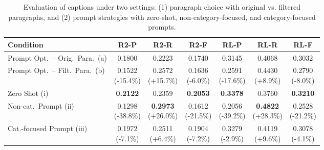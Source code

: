 \documentclass{article} %
\begin{document}
\begin{table}[t]
\begin{subtable}{\linewidth}
\centering
{}
\begin{adjustbox}{max width=0.9\textwidth}
\begin{tabular}{lcccccc}
\toprule
\textbf{Condition} & R2-P & R2-R & R2-F & RL-P & RL-R & RL-F \\
\midrule
Prompt Opt.\ -- Orig.\ Para.\ (a) & 0.1800 & 0.2223 & 0.1740 & 0.3145 & 0.4068 & 0.3032 \\
Prompt Opt.\ -- Filt.\ Para.\ (b) & \makecell{0.1522 \\ (-15.4\%)} & \makecell{0.2572 \\ (+15.7\%)} 
& \makecell{0.1636 \\ (-6.0\%)} & \makecell{0.2591 \\ (-17.6\%)} 
& \makecell{0.4430 \\ (+8.9\%)}  & \makecell{0.2790 \\ (-8.0\%)} \\
\midrule
Zero Shot (i)       & \textbf{0.2122} & 0.2359 & \textbf{0.2053} & \textbf{0.3378} & 0.3760 & \textbf{0.3210} \\
Non-cat.\ Prompt (ii) & \makecell{0.1298 \\ (-38.8\%)} & \makecell{\textbf{0.2973} \\ (+26.0\%)} 
& \makecell{0.1612 \\ (-21.5\%)} & \makecell{0.2056 \\ (-39.2\%)} 
& \makecell{\textbf{0.4822} \\ (+28.3\%)} & \makecell{0.2528 \\ (-21.2\%)} \\
Cat.-focused Prompt (iii) & \makecell{0.1972 \\ (-7.1\%)} & \makecell{0.2511 \\ (+6.4\%)} 
& \makecell{0.1904 \\ (-7.2\%)} & \makecell{0.3279 \\ (-2.9\%)} 
& \makecell{0.4119 \\ (+9.6\%)} & \makecell{0.3078 \\ (-4.1\%)} \\
\bottomrule
\end{tabular}
\end{adjustbox}
\end{subtable}

\caption{Evaluation of captions under two settings: (1) paragraph choice with original vs. filtered paragraphs, and (2) prompt strategies with zero-shot, non-category-focused, and category-focused prompts.}
\label{tab:prompt-opt}
\end{table}
\end{document}
